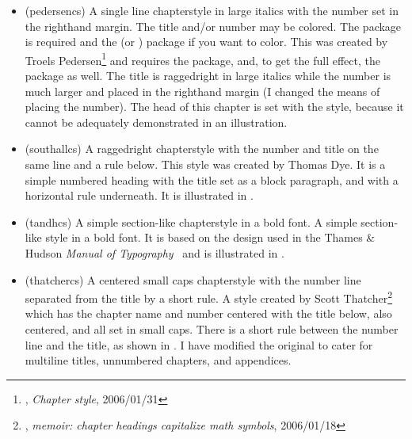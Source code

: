 \begin{itemize}



\item[\cstyle{pedersen}] 
\glossary(pedersencs)%
  {}%
  {A single line chapterstyle in large italics with the number set in the
  righthand margin. The title and/or number may be colored. The 
   package is required and the  
  (or ) package if you want to color.}
  This was created by
  Troels Pedersen\footnote{\ctt,
  \textit{Chapter style}, 2006/01/31} and requires the 
  package, and, to get the full effect, the  package as well.
  The title is raggedright in large italics while the number is much larger
  and placed in the righthand margin (I changed the means of placing the 
  number). The head of this chapter is set with the  style,
  because it cannot be adequately demonstrated in an illustration.



\item[\cstyle{southall}] 
\glossary(southallcs)%
  {}%
  { A raggedright chapterstyle with the number and title on the same line
   and a rule below.}
  This style was created by Thomas Dye. It
  is a simple numbered heading with the title set as a block 
  paragraph, and with a horizontal rule underneath. It is illustrated
  in .


\item[\cstyle{tandh}] 
\glossary(tandhcs)%
  {}%
  {A simple section-like chapterstyle in a bold font.}
A simple section-like style in a bold font. It is based on the design used in
the Thames \& Hudson \textit{Manual of Typography}~\cite{MCLEAN80} and 
is illustrated in 
.



\item[\cstyle{thatcher}] 
\glossary(thatchercs)%
  {}%
  {A centered small caps chapterstyle with the number line separated from 
   the title by a short rule.}
A style created by 
  Scott Thatcher\footnote{\ctt,
  \textit{memoir: chapter headings capitalize math symbols}, 2006/01/18} 
  which has the chapter name and number centered with the
  title below, also centered, and all set in small caps. There is a short rule
  between the number line and the title, as shown in . 
  I have modified the original to
  cater for multiline titles, unnumbered chapters, and appendices.


\end{itemize}
